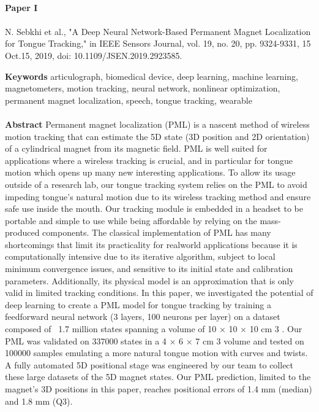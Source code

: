 \noindent
\\ 
\textbf{Paper I} 
\\ \\
\noindent
N. Sebkhi et al., "A Deep Neural Network-Based Permanent Magnet Localization for Tongue Tracking," in IEEE Sensors Journal, vol. 19, no. 20, pp. 9324-9331, 15 Oct.15, 2019, doi: 10.1109/JSEN.2019.2923585.

\noindent
\textbf{Keywords} articulograph, biomedical device, deep learning, machine learning, magnetometers, motion tracking, neural network, nonlinear optimization, permanent magnet localization, speech, tongue tracking, wearable
\\ \\

\noindent
\textbf{Abstract} Permanent magnet localization (PML) is a nascent method of wireless motion tracking that can estimate the 5D state (3D position and 2D orientation) of a cylindrical magnet from its magnetic field. PML is well suited for applications where a wireless tracking is crucial, and in particular for tongue motion which opens up many new interesting applications. To allow its usage outside of a research lab, our tongue tracking system relies on the PML to avoid impeding tongue's natural motion due to its wireless tracking method and ensure safe use inside the mouth. Our tracking module is embedded in a headset to be portable and simple to use while being affordable by relying on the mass-produced components. The classical implementation of PML has many shortcomings that limit its practicality for realworld applications because it is computationally intensive due to its iterative algorithm, subject to local minimum convergence issues, and sensitive to its initial state and calibration parameters. Additionally, its physical model is an approximation that is only valid in limited tracking conditions. In this paper, we investigated the potential of deep learning to create a PML model for tongue tracking by training a feedforward neural network (3 layers, 100 neurons per layer) on a dataset composed of ~1.7 million states spanning a volume of 10 × 10 × 10 cm 3 . Our PML was validated on 337000 states in a 4 × 6 × 7 cm 3 volume and tested on 100000 samples emulating a more natural tongue motion with curves and twists. A fully automated 5D positional stage was engineered by our team to collect these large datasets of the 5D magnet states. Our PML prediction, limited to the magnet's 3D positions in this paper, reaches positional errors of 1.4 mm (median) and 1.8 mm (Q3).\\ \\


